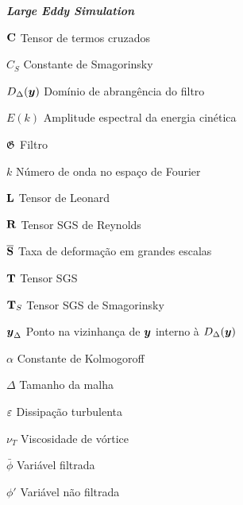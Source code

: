 \begin{simbolos}
    \item[\textbf{\textit{Large Eddy Simulation}}]
    \item[$\mathbf{C}$] Tensor de termos cruzados
    \item[$C_S$] Constante de Smagorinsky
    \item[$D_\Delta(\boldsymbol{y})$] Domínio de abrangência do filtro
    \item[$E(k)$] Amplitude espectral da energia cinética
    \item[$\mathfrak{G}$] Filtro
    \item[$k$] Número de onda no espaço de Fourier
    \item[$\mathbf{L}$] Tensor de Leonard
    \item[$\mathbf{R}$] Tensor SGS de Reynolds
    \item[$\overline{\mathbf{S}}$] Taxa de deformação em grandes escalas
    \item[$\mathbf{T}$] Tensor SGS
    \item[$\mathbf{T}_S$] Tensor SGS de Smagorinsky
    \item[$\boldsymbol{y}_\Delta$] Ponto na vizinhança de $\boldsymbol{y}$ interno à $D_\Delta(\boldsymbol{y})$
    \item[$\alpha$] Constante de Kolmogoroff
    \item[$\Delta$] Tamanho da malha
    \item[$\varepsilon$] Dissipação turbulenta
    \item[$\nu_T$] Viscosidade de vórtice
    \item[$\bar{\phi}$] Variável filtrada
    \item[$\phi'$] Variável não filtrada


\end{simbolos}
